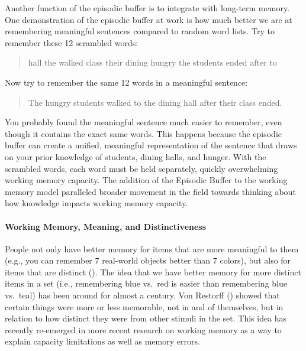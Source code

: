 \documentclass[
]{krantz}
\begin{document}
Another function of the episodic buffer is to integrate with long-term memory. One demonstration of the episodic buffer at work is how much better we are at remembering meaningful sentences compared to random word lists. Try to remember these 12 scrambled words:

\begin{quote}
hall the walked class their dining hungry the students ended after to
\end{quote}

Now try to remember the same 12 words in a meaningful sentence:

\begin{quote}
The hungry students walked to the dining hall after their class ended.
\end{quote}

You probably found the meaningful sentence much easier to remember, even though it contains the exact same words. This happens because the episodic buffer can create a unified, meaningful representation of the sentence that draws on your prior knowledge of students, dining halls, and hunger. With the scrambled words, each word must be held separately, quickly overwhelming working memory capacity. The addition of the Episodic Buffer to the working memory model paralleled broader movement in the field towards thinking about how knowledge impacts working memory capacity.

\paragraph*{Working Memory, Meaning, and Distinctiveness}\label{working-memory-meaning-and-distinctiveness}

People not only have better memory for items that are more meaningful to them (e.g., you can remember 7 real-world objects better than 7 colors), but also for items that are distinct (). The idea that we have better memory for more distinct items in a set (i.e., remembering blue vs.~red is easier than remembering blue vs.~teal) has been around for almost a century. Von Restorff () showed that certain things were more or less memorable, not in and of themselves, but in relation to how distinct they were from other stimuli in the set. This idea has recently re-emerged in more recent research on working memory as a way to explain capacity limitations as well as memory errors.
\end{document}
